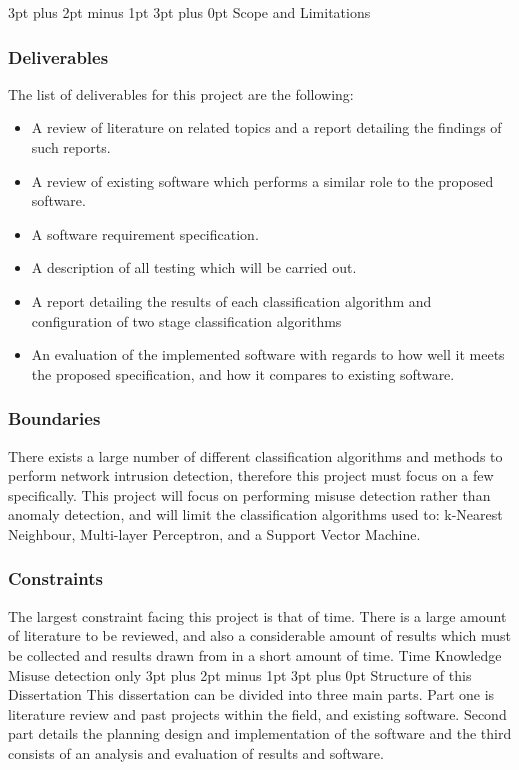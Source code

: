 \documentclass[12pt,a4paper]{article}
\makeatletter
\renewcommand\subsection{\@startsection {subsection}{1}{2mm} %
                               {3pt plus 2pt minus 1pt} %
                               {3pt plus 0pt} %
                               {\normalfont\bfseries}}
\makeatother
\begin{document}
\subsection{Scope and Limitations}
	\subsubsection{Deliverables}
	The list of deliverables for this project are the following:
	\begin{itemize}
	\item{A review of literature on related topics and a report detailing the findings of such reports.}
	\item{A review of existing software which performs a similar role to the proposed software.}
	\item{A software requirement specification.}
	\item{A description of all testing which will be carried out.}
	\item{A report detailing the results of each classification algorithm and configuration of two stage classification algorithms}
	\item{An evaluation of the implemented software with regards to how well it meets the proposed specification, and how it compares to existing software.}
	\end{itemize}
	\subsubsection{Boundaries}
	There exists a large number of different classification algorithms and methods to perform network intrusion detection, therefore this project must focus on a few specifically. This project will focus on performing misuse detection rather than anomaly detection, and will limit the classification algorithms used to: k-Nearest Neighbour, Multi-layer Perceptron, and a Support Vector Machine.
	\subsubsection{Constraints}
	The largest constraint facing this project is that of time. There is a large amount of literature to be reviewed, and also a considerable amount of results which must be collected and results drawn from in a short amount of time.
	Time
	Knowledge
	Misuse detection only
\subsection{Structure of this Dissertation}
This dissertation can be divided into three main parts. Part one is literature review and past projects within the field, and existing software. Second part details the planning design and implementation of the software and the third consists of an analysis and evaluation of results and software.
\end{document}
